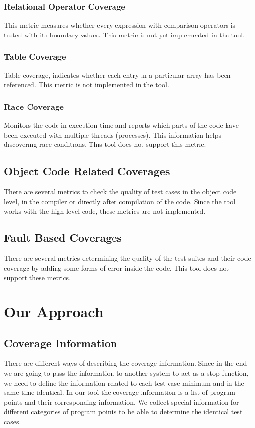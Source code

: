 \documentclass[12pt,a4paper]{report}
\begin{document}
\subsection{Relational Operator Coverage}
This metric measures whether every expression with comparison operators is tested with its boundary values.
This metric is not yet implemented in the tool.
 
\subsection{Table Coverage}
Table coverage, indicates whether each entry in a particular array has been referenced.\cite{andersson2005automatic}
This metric is not implemented in the tool.

\subsection{Race Coverage}
Monitors the code in execution time and reports which parts of the code have been executed with multiple threads (processes). This information helps discovering race conditions. 
This tool does not support this metric.

\section{Object Code Related Coverages}
There are several metrics to check the quality of test cases in the object code level, in the compiler or directly after compilation of the code.
Since the tool works with the high-level code, these metrics are not implemented.

\section{Fault Based Coverages}
There are several metrics determining the quality of the test suites and their code coverage by adding some forms of error inside the code.
This tool does not support these metrics.

\chapter{Our Approach}
\newpage

\section{Coverage Information}
There are different ways of describing the coverage information. Since in the end we are going to pass the information to another system to act as a stop-function, we need to
 define the information related to each test case minimum and in the same time identical. In our tool the coverage information is a list of program points and their
 corresponding information. We collect special information for different categories of program points to be able to determine the identical test cases.
\end{document}
